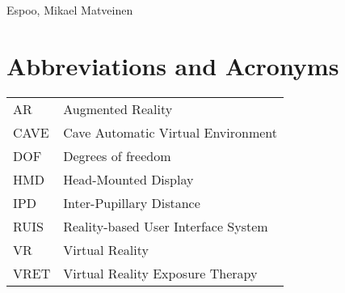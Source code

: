 \documentclass[12pt,a4paper,oneside,pdftex]{report}
\newcommand{\DATE}{}
\newcommand{\AUTHOR}{Mikael Matveinen}
\begin{document}
\vskip 10mm

\noindent Espoo, \DATE
\vskip 5mm
\noindent\AUTHOR

\cleardoublepage
% 

\chapter*{Abbreviations and Acronyms}


\noindent
\begin{longtable}{@{}p{}p{}@{}}
AR & Augmented Reality \\
CAVE & Cave Automatic Virtual Environment \\
DOF & Degrees of freedom \\
HMD & Head-Mounted Display \\
IPD & Inter-Pupillary Distance \\
RUIS & Reality-based User Interface System \\
VR & Virtual Reality \\
VRET & Virtual Reality Exposure Therapy
\end{longtable}


\cleardoublepage
\tableofcontents


\end{document}
